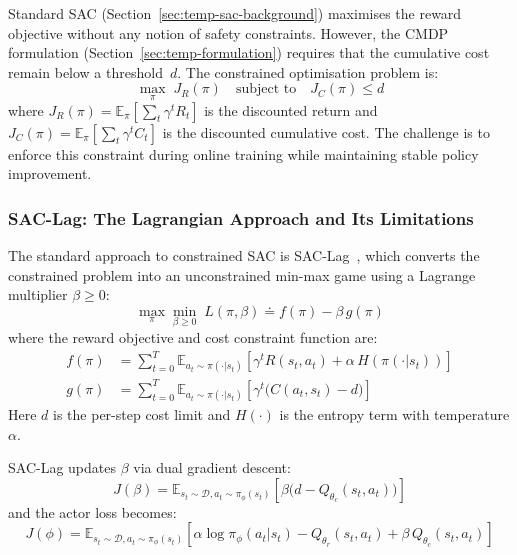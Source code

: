 Standard SAC (Section~\ref{sec:temp-sac-background}) maximises the reward
objective without any notion of safety constraints.  However, the CMDP
formulation (Section~\ref{sec:temp-formulation}) requires that the cumulative
cost remain below a threshold~$d$.  The constrained optimisation problem is:
\begin{equation}
  \max_\pi\; J_R(\pi) \quad \text{subject to} \quad J_C(\pi) \leq d
  \label{eq:cmdp-problem}
\end{equation}
where $J_R(\pi) = \mathbb{E}_\pi\!\left[\sum_t \gamma^t R_t\right]$ is the
discounted return and
$J_C(\pi) = \mathbb{E}_\pi\!\left[\sum_t \gamma^t C_t\right]$ is the
discounted cumulative cost.  The challenge is to enforce this constraint
during online training while maintaining stable policy improvement.

\subsubsection{SAC-Lag: The Lagrangian Approach and Its Limitations}

The standard approach to constrained SAC is SAC-Lag~\cite{ha2020learning,
achiam2021exploration}, which converts the constrained problem into an
unconstrained min-max game using a Lagrange multiplier $\beta \geq 0$:
\begin{equation}
  \max_\pi \min_{\beta \geq 0}\; L(\pi, \beta) \doteq
    f(\pi) - \beta\, g(\pi)
  \label{eq:sac-lag-objective}
\end{equation}
where the reward objective and cost constraint function are:
\begin{align}
  f(\pi) &= \sum_{t=0}^{T} \mathbb{E}_{a_t \sim \pi(\cdot|s_t)}
    \!\left[\gamma^t R(s_t, a_t) + \alpha\, H\!\left(\pi(\cdot|s_t)\right)\right]
  \label{eq:reward-objective} \\
  g(\pi) &= \sum_{t=0}^{T} \mathbb{E}_{a_t \sim \pi(\cdot|s_t)}
    \!\left[\gamma^t \bigl(C(a_t, s_t) - d\bigr)\right]
  \label{eq:cost-constraint}
\end{align}
Here $d$ is the per-step cost limit and $H(\cdot)$ is the entropy term with
temperature $\alpha$.

SAC-Lag updates $\beta$ via dual gradient descent:
\begin{equation}
  J(\beta) = \mathbb{E}_{s_t \sim \mathcal{D}, a_t \sim \pi_\phi(s_t)}
    \!\left[\beta\bigl(d - Q_{\theta_c}(s_t, a_t)\bigr)\right]
  \label{eq:lagrange-update}
\end{equation}
and the actor loss becomes:
\begin{equation}
  J(\phi) = \mathbb{E}_{s_t \sim \mathcal{D}, a_t \sim \pi_\phi(s_t)}
    \!\left[
      \alpha \log \pi_\phi(a_t | s_t)
      - Q_{\theta_r}(s_t, a_t)
      + \beta\, Q_{\theta_c}(s_t, a_t)
    \right]
  \label{eq:sac-lag-actor}
\end{equation}

